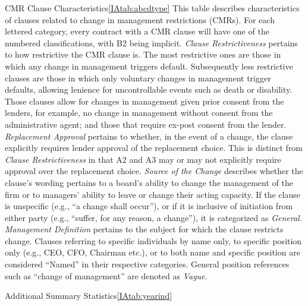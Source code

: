 \documentclass[12pt]{article}
\begin{document}
\begin{appendices}
\begin{singlespace}
\begin{landscapepapertable}{CMR Clause Characteristics}{\ref{IAtab:abcdtype}}{}
    This table describes characteristics of clauses related to change in management restrictions (CMRs).
    For each lettered category, every contract with a CMR clause will have one of the numbered classifications, with B2 being implicit.
    \textit{Clause Restrictiveness} pertains to how restrictive the CMR clause is.
    The most restrictive ones are those in which any change in management triggers default.
    Subsequently less restrictive clauses are those in which only voluntary changes in management trigger defaults, allowing lenience for uncontrollable events such as death or disability.
    Those clauses allow for changes in management given prior consent from the lenders, for example, no change in management without consent from the administrative agent; and those that require ex-post consent from the lender.
    \textit{Replacement Approval} pertains to whether, in the event of a change, the clause explicitly requires lender approval of the replacement choice.
    This is distinct from \textit{Clause Restrictiveness} in that A2 and A3 may or may not explicitly require approval over the replacement choice.
    \textit{Source of the Change} describes whether the clause's wording pertains to a board's ability to change the management of the firm or to managers' ability to leave or change their acting capacity.
    If the clause is unspecific (e.g., ``a change shall occur''), or if it is inclusive of initiation from either party (e.g., ``suffer, for any reason, a change''), it is categorized as \textit{General}.
    \textit{Management Definition} pertains to the subject for which the clause restricts change.
    Clauses referring to specific individuals by name only, to specific position only (e.g., CEO, CFO, Chairman etc.), or to both name and specific position are considered ``Named'' in their respective categories. General position references such as ``change of management'' are denoted as \textit{Vague}.

    \startdata
    \def\arraystretch{.9}
    
\end{landscapepapertable}






\begin{papertable}{Additional Summary Statistics}{\ref{IAtab:yearind}}{}
    \label{IAtab:yearind}


\end{papertable}
\end{singlespace}
\end{appendices}
\end{document}
